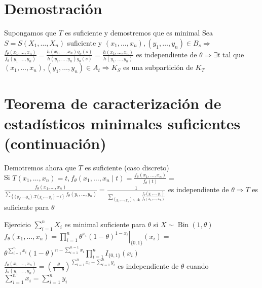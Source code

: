 \section*{Demostración}
Supongamos que $T$ es suficiente y demostremos que es minimal Sea $S=S\left(X_{1}, \ldots, X_{n}\right)$ suficiente y $\left(x_{1}, \ldots, x_{n}\right),\left(y_{1}, \ldots, y_{n}\right) \in B_{s} \Rightarrow$ $\frac{f_{\theta}\left(x_{1}, \ldots, x_{n}\right)}{f_{\theta}\left(y_{1}, \ldots, y_{n}\right)}=\frac{h\left(x_{1}, \ldots, x_{n}\right) g_{\theta}(s)}{h\left(y_{1}, \ldots, y_{n}\right) g_{\theta}(s)}=\frac{h\left(x_{1}, \ldots, x_{n}\right)}{h\left(y_{1}, \ldots, y_{n}\right)}$ es independiente de $\theta \Rightarrow \exists t$ tal que $\left(x_{1}, \ldots, x_{n}\right),\left(y_{1}, \ldots, y_{n}\right) \in A_{t} \Rightarrow K_{S}$ es una subpartición de $K_{T}$

\section*{Teorema de caracterización de estadísticos minimales suficientes (continuación)}
Demotremos ahora que $T$ es suficiente (caso discreto)\\
Si $T\left(x_{1}, \ldots, x_{n}\right)=t, f_{\theta}\left(x_{1}, \ldots, x_{n} \mid t\right)=\frac{f_{\theta}\left(x_{1}, \ldots, x_{n}\right)}{f_{\theta}(t)}=$\\
$\frac{f_{\theta}\left(x_{1}, \ldots, x_{n}\right)}{\sum_{\left\{\left(y_{1}, \ldots, y_{n}\right): T\left(y_{1}, \ldots, y_{n}\right)=t\right\}} f_{\theta}\left(y_{1}, \ldots, y_{n}\right)}=\frac{1}{\sum_{\left(y_{1}, \ldots, y_{n}\right) \in A_{t}} \frac{f_{\theta}\left(y_{1}, \ldots, y_{n}\right)}{f_{\theta}\left(x_{1}, \ldots, x_{n}\right)}}$ es independiente de $\theta \Rightarrow T$ es suficiente para $\theta$

Ejercicio $\sum_{i=1}^{n} X_{i}$ es minimal suficiente para $\theta$ si $X \sim \operatorname{Bin}(1, \theta)$\\
$f_{\theta}\left(x_{1}, \ldots, x_{n}\right)=\left.\prod_{i=1}^{n} \theta^{x_{i}}(1-\theta)^{1-x_{i}}\right|_{\{0,1\}}\left(x_{i}\right)=$\\
$\theta^{\sum_{i=1}^{n} x_{i}}(1-\theta)^{n-\sum_{i=1}^{n=1} x_{i}} \prod_{i=1}^{n} I_{\{0,1\}}\left(x_{i}\right)$\\
$\frac{f_{\theta}\left(x_{1}, \ldots, x_{n}\right)}{f_{\theta}\left(y_{1}, \ldots, y_{n}\right)}=\left(\frac{\theta}{1-\theta}\right)^{\sum_{i=1}^{n} x_{i}-\sum_{i=1}^{n} y_{i}}$ es independiente de $\theta$ cuando\\
$\sum_{i=1}^{n} x_{i}=\sum_{i=1}^{n} y_{i}$


